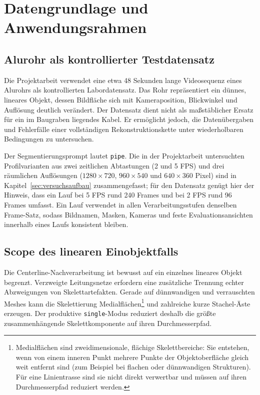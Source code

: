 \section{Datengrundlage und Anwendungsrahmen}
\label{sec:datengrundlage}

\subsection{Alurohr als kontrollierter Testdatensatz}

Die Projektarbeit verwendet eine etwa 48 Sekunden lange Videosequenz eines
Alurohrs als kontrollierten Labordatensatz. Das Rohr repräsentiert ein dünnes,
lineares Objekt, dessen Bildfläche sich mit Kameraposition, Blickwinkel und
Auflösung deutlich verändert. Der Datensatz dient nicht als maßstäblicher
Ersatz für ein im Baugraben liegendes Kabel. Er ermöglicht jedoch, die
Datenübergaben und Fehlerfälle einer vollständigen Rekonstruktionskette unter
wiederholbaren Bedingungen zu untersuchen.

Der Segmentierungsprompt lautet \texttt{pipe}. Die in der Projektarbeit
untersuchten Profilvarianten aus zwei zeitlichen Abtastungen (2 und 5 FPS) und
drei räumlichen Auflösungen ($1280\times720$, $960\times540$ und
$640\times360$ Pixel) sind in Kapitel~\ref{sec:versuchsaufbau} zusammengefasst;
für den Datensatz genügt hier der Hinweis, dass ein Lauf bei 5 FPS rund 240
Frames und bei 2 FPS rund 96 Frames umfasst. Ein Lauf verwendet in allen
Verarbeitungsstufen denselben Frame-Satz, sodass Bildnamen, Masken, Kameras
und feste Evaluationsansichten innerhalb eines Laufs konsistent bleiben.

\subsection{Scope des linearen Einobjektfalls}

Die Centerline-Nachverarbeitung ist bewusst auf ein einzelnes lineares Objekt
begrenzt. Verzweigte Leitungsnetze erfordern eine zusätzliche Trennung echter
Abzweigungen von Skelettartefakten. Gerade auf dünnwandigen und verrauschten
Meshes kann die Skelettierung Medialflächen\footnote{Medialflächen sind
zweidimensionale, flächige Skelettbereiche: Sie entstehen, wenn von einem
inneren Punkt mehrere Punkte der Objektoberfläche gleich weit entfernt sind
(zum Beispiel bei flachen oder dünnwandigen Strukturen). Für eine
Linientrasse sind sie nicht direkt verwertbar und müssen auf ihren
Durchmesserpfad reduziert werden.\label{fn:medialflaechen}} und zahlreiche
kurze Stachel-Äste erzeugen. Der produktive \texttt{single}-Modus reduziert
deshalb die größte zusammenhängende Skelettkomponente auf ihren
Durchmesserpfad.

